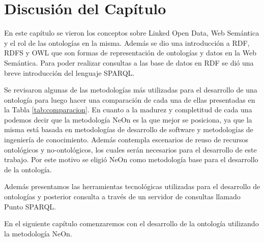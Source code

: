 \section{Discusión del Capítulo}
En este capítulo se vieron los conceptos sobre Linked Open Data, Web Semántica y el rol de las ontologías en la misma. Además se dio una introducción a RDF, RDFS y OWL que son formas de representación de ontologías y datos en la Web Semántica. Para poder realizar consultas a las base de datos en RDF se dió una breve introducción del lenguaje SPARQL.

Se revisaron algunas de las metodologías más utilizadas para el desarrollo de una ontología para luego hacer una comparación de cada una de ellas presentadas en la Tabla \ref{tab:comparacion}. En cuanto a la madurez y completitud de cada una podemos decir que la metodología NeOn es la que mejor se posiciona, ya que la misma está basada en metodologías de desarrollo de software y metodologías de ingeniería de conocimiento. Además contempla escenarios de reuso de recursos ontológicos y no-ontológicos, los cuales serán necesarios para el desarrollo de este trabajo. Por este motivo se eligió NeOn como metodología base para el desarrollo de la ontología.

Además presentamos las herramientas tecnológicas utilizadas para el desarrollo de ontologías y posterior consulta a través de un servidor de consultas llamado Punto SPARQL.

En el siguiente capítulo comenzaremos con el desarrollo de la ontología utilizando la metodología NeOn.
